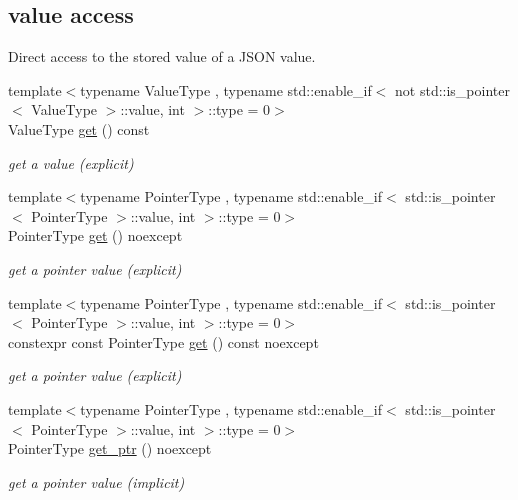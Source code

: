 \subsection*{value access}
\label{_amgrpd8f53c9caf18314e5b3f758245606995}%
Direct access to the stored value of a J\+S\+ON value. \begin{DoxyCompactItemize}
\item 
{\footnotesize template$<$typename Value\+Type , typename std\+::enable\+\_\+if$<$ not std\+::is\+\_\+pointer$<$ Value\+Type $>$\+::value, int $>$\+::type  = 0$>$ }\\Value\+Type \hyperlink{classnlohmann_1_1basic__json_aba0695744dbcdad65825f91768a8f04f}{get} () const
\begin{DoxyCompactList}\small\item\em get a value (explicit) \end{DoxyCompactList}\item 
{\footnotesize template$<$typename Pointer\+Type , typename std\+::enable\+\_\+if$<$ std\+::is\+\_\+pointer$<$ Pointer\+Type $>$\+::value, int $>$\+::type  = 0$>$ }\\Pointer\+Type \hyperlink{classnlohmann_1_1basic__json_ac5693cff1df0775cd3fbe960412cde4b}{get} () noexcept
\begin{DoxyCompactList}\small\item\em get a pointer value (explicit) \end{DoxyCompactList}\item 
{\footnotesize template$<$typename Pointer\+Type , typename std\+::enable\+\_\+if$<$ std\+::is\+\_\+pointer$<$ Pointer\+Type $>$\+::value, int $>$\+::type  = 0$>$ }\\constexpr const Pointer\+Type \hyperlink{classnlohmann_1_1basic__json_a9008c688b9bd5798e4090c971d20ee92}{get} () const noexcept
\begin{DoxyCompactList}\small\item\em get a pointer value (explicit) \end{DoxyCompactList}\item 
{\footnotesize template$<$typename Pointer\+Type , typename std\+::enable\+\_\+if$<$ std\+::is\+\_\+pointer$<$ Pointer\+Type $>$\+::value, int $>$\+::type  = 0$>$ }\\Pointer\+Type \hyperlink{classnlohmann_1_1basic__json_a7ab11375ed2e29c2fcb6119386851445}{get\+\_\+ptr} () noexcept
\begin{DoxyCompactList}\small\item\em get a pointer value (implicit) \end{DoxyCompactList}\item 

\end{DoxyCompactItemize}
